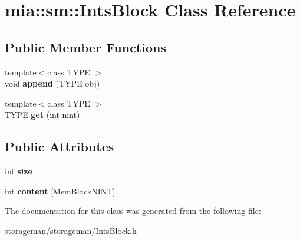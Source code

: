 \hypertarget{classmia_1_1sm_1_1_ints_block}{\section{mia\-:\-:sm\-:\-:Ints\-Block Class Reference}
\label{classmia_1_1sm_1_1_ints_block}
}
\subsection*{Public Member Functions}
\begin{DoxyCompactItemize}
\item 
\hypertarget{classmia_1_1sm_1_1_ints_block_a5d9e15e2d7196a84746cbbb2db2b90aa}{{\footnotesize template$<$class T\-Y\-P\-E $>$ }\\void {\bfseries append} (T\-Y\-P\-E obj)}\label{classmia_1_1sm_1_1_ints_block_a5d9e15e2d7196a84746cbbb2db2b90aa}

\item 
\hypertarget{classmia_1_1sm_1_1_ints_block_a2f8109be82fff2222b1163e4ea82e223}{{\footnotesize template$<$class T\-Y\-P\-E $>$ }\\T\-Y\-P\-E {\bfseries get} (int nint)}\label{classmia_1_1sm_1_1_ints_block_a2f8109be82fff2222b1163e4ea82e223}

\end{DoxyCompactItemize}
\subsection*{Public Attributes}
\begin{DoxyCompactItemize}
\item 
\hypertarget{classmia_1_1sm_1_1_ints_block_a0081a01b017e835aaa428875a6428409}{int {\bfseries size}}\label{classmia_1_1sm_1_1_ints_block_a0081a01b017e835aaa428875a6428409}

\item 
\hypertarget{classmia_1_1sm_1_1_ints_block_a5bca4c9ccc401e60a045233adaef3d8f}{int {\bfseries content} \mbox{[}Mem\-Block\-N\-I\-N\-T\mbox{]}}\label{classmia_1_1sm_1_1_ints_block_a5bca4c9ccc401e60a045233adaef3d8f}

\end{DoxyCompactItemize}


The documentation for this class was generated from the following file\-:\begin{DoxyCompactItemize}
\item 
storageman/storageman/Ints\-Block.\-h\end{DoxyCompactItemize}
